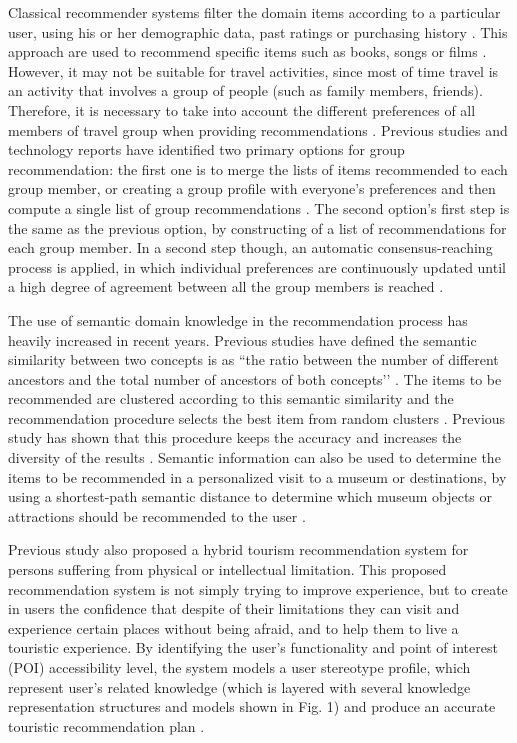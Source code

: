 Classical recommender systems filter the domain items according to a particular user, using his or her demographic data, past ratings or purchasing history \cite{LU201512}. This approach are used to recommend specific items such as books, songs or films \cite{LU201512}. However, it may not be suitable for travel activities, since most of time travel is an activity that involves a group of people (such as family members, friends). Therefore, it is necessary to take into account the different preferences of all members of travel group when providing recommendations \cite{morenorecommender}. Previous studies and technology reports have identified two primary options for group recommendation: the first one is to merge the lists of items recommended to each group member, or creating a group profile with everyone’s preferences and then compute a single list of group recommendations \cite{Garcia2009}. The second option’s first step is the same as the previous option, by constructing of a list of recommendations for each group member. In a second step though, an automatic consensus-reaching process is applied, in which individual preferences are continuously updated until a high degree of agreement between all the group members is reached \cite{Garcia2009}.

The use of semantic domain knowledge in the recommendation process has heavily increased in recent years. Previous studies have defined the semantic similarity between two concepts is as ``the ratio between the number of different ancestors and the total number of ancestors of both concepts’’ \cite{morenorecommender}. The items to be recommended are clustered according to this semantic similarity and the recommendation procedure selects the best item from random clusters \cite{Santos2018}. Previous study has shown that this procedure keeps the accuracy and increases the diversity of the results \cite{morenorecommender}. Semantic information can also be used to determine the items to be recommended in a personalized visit to a museum or destinations, by using a shortest-path semantic distance to determine which museum objects or attractions should be recommended to the user \cite{morenorecommender}. 

Previous study also proposed a hybrid tourism recommendation system for persons suffering from physical or intellectual limitation. This proposed recommendation system is not simply trying to improve experience, but to create in users the confidence that despite of their limitations they can visit and experience certain places without being afraid, and to help them to live a touristic experience. By identifying the user’s functionality and point of interest (POI) accessibility level, the system models a user stereotype profile, which represent user’s related knowledge (which is layered with several knowledge representation structures and models shown in Fig. 1) and produce an accurate touristic recommendation plan \cite{Santos2018}.



